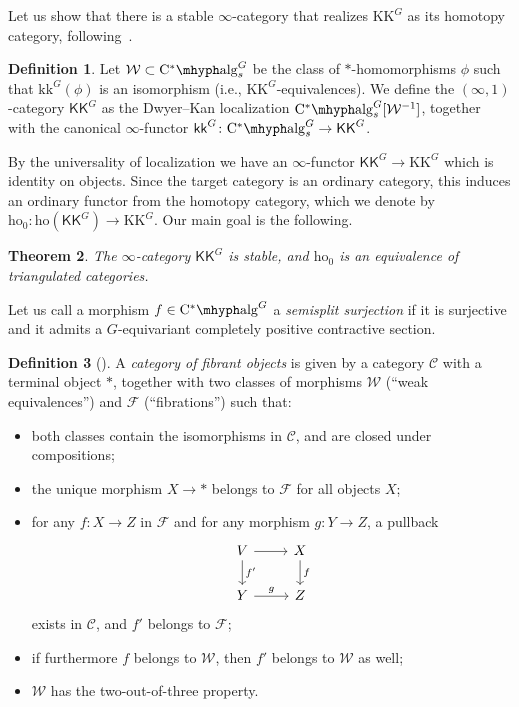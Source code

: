 \documentclass[a4paper,reqno]{amsart}
\theoremstyle{plain}
\newtheorem{theorem}{Theorem}[section]
\theoremstyle{definition}
\newtheorem{definition}[theorem]{Definition}
\theoremstyle{remark}
\numberwithin{equation}{section}
\newcommand{\cC}{\mathcal{C}}
\newcommand{\cF}{\mathcal{F}}
\newcommand{\cW}{\mathcal{W}}
\newcommand{\CstAlg}{\mathrm{C}^*\mhyph\mathrm{alg}}
\newcommand{\ho}{\mathrm{ho}}
\newcommand{\KK}{\mathrm{KK}}
\newcommand{\kk}{\mathrm{kk}}
\newcommand{\icKK}{\mathsf{KK}}
\newcommand{\ickk}{\mathsf{kk}}
\begin{document}
Let us show that there is a stable $\infty$-category that realizes $\KK^G$ as its homotopy category, following~.

\begin{definition}
Let $\cW\subset \CstAlg_s^G$ be the class of $*$-homomorphisms $\phi$ such that $\kk^G(\phi)$ is an isomorphism (i.e., $\KK^G$-equivalences).
We define the $(\infty, 1)$-category $\icKK^G$ as the Dwyer--Kan localization $\CstAlg_s^G[\cW^{-1}]$, together with the canonical $\infty$-functor $\ickk^G \colon \CstAlg_s^G \to \icKK^G$.
\end{definition}

By the universality of localization we have an $\infty$-functor $\icKK^G \to \KK^G$ which is identity on objects.
Since the target category is an ordinary category, this induces an ordinary functor from the homotopy category, which we denote by $\ho_0\colon \ho(\icKK^G)\to \KK^G$.
Our main goal is the following.

\begin{theorem}\label{thm:kkg-infty-stable-tri}
The $\infty$-category $\icKK^G$ is stable, and $\ho_0$ is an equivalence of triangulated categories.
\end{theorem}

Let us call a morphism $f\in \CstAlg^G$ a \emph{semisplit surjection} if it is surjective and it admits a $G$-equivariant completely positive contractive section.

\begin{definition}[\cite{MR341469}]
A \emph{category of fibrant objects} is given by a category $\cC$ with a terminal object $*$, together with two classes of morphisms $\cW$ (``weak equivalences'') and $\cF$ (``fibrations'') such that:
\begin{itemize}
\item both classes contain the isomorphisms in $\cC$, and are closed under compositions;
\item the unique morphism $X \to *$ belongs to $\cF$ for all objects $X$;
\item for any $f \colon X \to Z$ in $\cF$ and for any morphism $g \colon Y \to Z$, a pullback
\begin{equation}\label{eq:pullback}
\begin{tikzcd}
  V \arrow[r] \arrow[d, "f'"] & X \arrow[d, "f"] \\
  Y \arrow[r, "g"] & Z
\end{tikzcd}
\end{equation}
exists in $\cC$, and $f'$ belongs to $\cF$;
\item if furthermore $f$ belongs to $\cW$, then $f'$ belongs to $\cW$ as well;
\item $\cW$ has the two-out-of-three property.
\end{itemize}
\end{definition}
 
\end{document}
